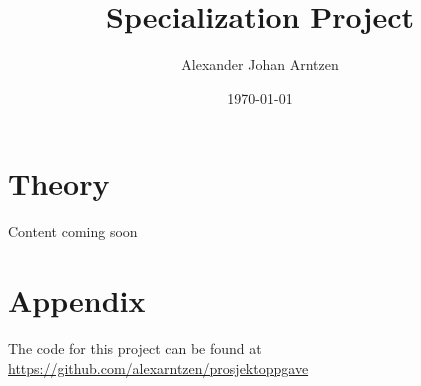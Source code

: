 \documentclass[a4paper]{article}
\title{Specialization Project}
\author{Alexander Johan Arntzen }
\date{\today}
\begin{document}
\maketitle

\section{Theory}
Content coming soon
\cite{lystad2019}

\section*{Appendix}
The code for this project can be found at \url{https://github.com/alexarntzen/prosjektoppgave}


\printbibliography
\end{document}
